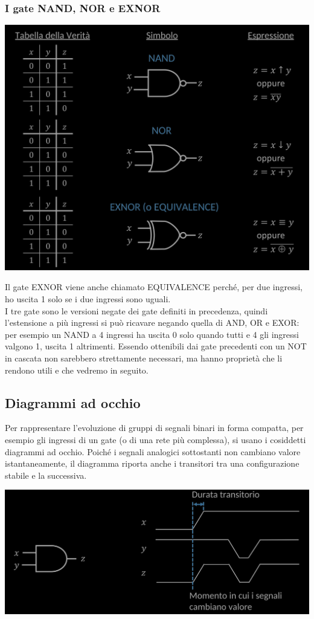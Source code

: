 \documentclass{article}
\begin{document}
\subsubsection{I gate NAND, NOR e EXNOR}
\begin{center}
    \includegraphics[scale=0.43]{nand.png}
\end{center}
Il gate EXNOR viene anche chiamato EQUIVALENCE perché, per due ingressi, ho uscita 1 solo se i due ingressi sono uguali.
\vspace{0.2cm}\\
I tre gate sono le versioni negate dei gate definiti in precedenza, quindi l’estensione a più ingressi si può ricavare negando quella di AND, OR e EXOR: per esempio un NAND a 4 ingressi ha uscita 0 solo quando tutti e 4 gli ingressi valgono 1, uscita 1 altrimenti. Essendo ottenibili dai gate precedenti con un NOT in cascata non sarebbero strettamente necessari, ma hanno proprietà che li rendono utili e che vedremo in seguito.
\subsection{Diagrammi ad occhio}
Per rappresentare l’evoluzione di gruppi di segnali binari in forma compatta, per esempio gli ingressi di un gate (o di una rete più complessa), si usano i cosiddetti diagrammi ad occhio. Poiché i segnali analogici sottostanti non cambiano valore istantaneamente, il diagramma riporta anche i transitori tra una configurazione stabile e la successiva.
\begin{center}
    \includegraphics[scale=0.33]{diagrammiocchio.png}
\end{center}
\end{document}
